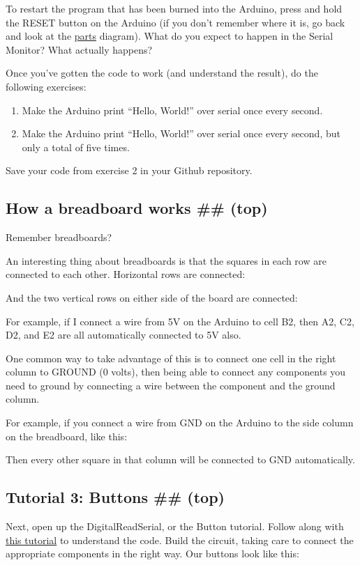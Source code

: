 \documentclass[letterpaper,10pt,english]{/usr/local/lib/python2.7/dist-packages/sphinx/texinputs/sphinxhowto}
\begin{document}
To restart the program that has been burned into the Arduino, press and
hold the RESET button on the Arduino (if you don't remember where it is,
go back and look at the \href{\#parts}{parts} diagram). What do you
expect to happen in the Serial Monitor? What actually happens?

Once you've gotten the code to work (and understand the result), do the
following exercises:

\begin{enumerate}[1.]
\item
  Make the Arduino print ``Hello, World!'' over serial once every
  second.
\item
  Make the Arduino print ``Hello, World!'' over serial once every
  second, but only a total of five times.
\end{enumerate}
Save your code from exercise 2 in your Github repository.\subsection{How a breadboard works \#\# (top)}

Remember breadboards?

An interesting thing about breadboards is that the squares in each row
are connected to each other. Horizontal rows are connected:

And the two vertical rows on either side of the board are connected:

For example, if I connect a wire from 5V on the Arduino to cell B2, then
A2, C2, D2, and E2 are all automatically connected to 5V also.

One common way to take advantage of this is to connect one cell in the
right column to GROUND (0 volts), then being able to connect any
components you need to ground by connecting a wire between the component
and the ground column.

For example, if you connect a wire from GND on the Arduino to the side
column on the breadboard, like this:

Then every other square in that column will be connected to GND
automatically.\subsection{Tutorial 3: Buttons \#\# (top)}

Next, open up the DigitalReadSerial, or the Button tutorial. Follow
along with \href{http://arduino.cc/en/Tutorial/DigitalReadSerial}{this
tutorial} to understand the code. Build the circuit, taking care to
connect the appropriate components in the right way. Our buttons look
like this:
\end{document}
